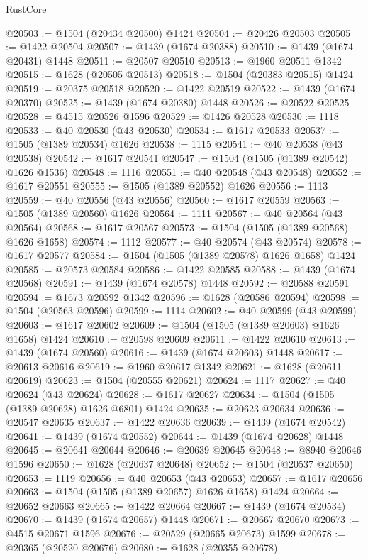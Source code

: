 \begin{lexlean}{RustCore}
\begin{coremodule}
@20503 := @1504 (@20434 @20500) @1424
@20504 := @20426 @20503
@20505 := @1422 @20504
@20507 := @1439 (@1674 @20388)
@20510 := @1439 (@1674 @20431) @1448
@20511 := @20507 @20510
@20513 := @1960 @20511 @1342
@20515 := @1628 (@20505 @20513)
@20518 := @1504 (@20383 @20515) @1424
@20519 := @20375 @20518
@20520 := @1422 @20519
@20522 := @1439 (@1674 @20370)
@20525 := @1439 (@1674 @20380) @1448
@20526 := @20522 @20525
@20528 := @4515 @20526 @1596
@20529 := @1426 @20528
@20530 := 1118
@20533 := @40 @20530 (@43 @20530)
@20534 := @1617 @20533
@20537 := @1505 (@1389 @20534) @1626
@20538 := 1115
@20541 := @40 @20538 (@43 @20538)
@20542 := @1617 @20541
@20547 := @1504 (@1505 (@1389 @20542) @1626 @1536)
@20548 := 1116
@20551 := @40 @20548 (@43 @20548)
@20552 := @1617 @20551
@20555 := @1505 (@1389 @20552) @1626
@20556 := 1113
@20559 := @40 @20556 (@43 @20556)
@20560 := @1617 @20559
@20563 := @1505 (@1389 @20560) @1626
@20564 := 1111
@20567 := @40 @20564 (@43 @20564)
@20568 := @1617 @20567
@20573 := @1504 (@1505 (@1389 @20568) @1626 @1658)
@20574 := 1112
@20577 := @40 @20574 (@43 @20574)
@20578 := @1617 @20577
@20584 := @1504 (@1505 (@1389 @20578) @1626 @1658) @1424
@20585 := @20573 @20584
@20586 := @1422 @20585
@20588 := @1439 (@1674 @20568)
@20591 := @1439 (@1674 @20578) @1448
@20592 := @20588 @20591
@20594 := @1673 @20592 @1342
@20596 := @1628 (@20586 @20594)
@20598 := @1504 (@20563 @20596)
@20599 := 1114
@20602 := @40 @20599 (@43 @20599)
@20603 := @1617 @20602
@20609 := @1504 (@1505 (@1389 @20603) @1626 @1658) @1424
@20610 := @20598 @20609
@20611 := @1422 @20610
@20613 := @1439 (@1674 @20560)
@20616 := @1439 (@1674 @20603) @1448
@20617 := @20613 @20616
@20619 := @1960 @20617 @1342
@20621 := @1628 (@20611 @20619)
@20623 := @1504 (@20555 @20621)
@20624 := 1117
@20627 := @40 @20624 (@43 @20624)
@20628 := @1617 @20627
@20634 := @1504 (@1505 (@1389 @20628) @1626 @6801) @1424
@20635 := @20623 @20634
@20636 := @20547 @20635
@20637 := @1422 @20636
@20639 := @1439 (@1674 @20542)
@20641 := @1439 (@1674 @20552)
@20644 := @1439 (@1674 @20628) @1448
@20645 := @20641 @20644
@20646 := @20639 @20645
@20648 := @8940 @20646 @1596
@20650 := @1628 (@20637 @20648)
@20652 := @1504 (@20537 @20650)
@20653 := 1119
@20656 := @40 @20653 (@43 @20653)
@20657 := @1617 @20656
@20663 := @1504 (@1505 (@1389 @20657) @1626 @1658) @1424
@20664 := @20652 @20663
@20665 := @1422 @20664
@20667 := @1439 (@1674 @20534)
@20670 := @1439 (@1674 @20657) @1448
@20671 := @20667 @20670
@20673 := @4515 @20671 @1596
@20676 := @20529 (@20665 @20673) @1599
@20678 := @20365 (@20520 @20676)
@20680 := @1628 (@20355 @20678)

\end{coremodule}
\end{lexlean}
